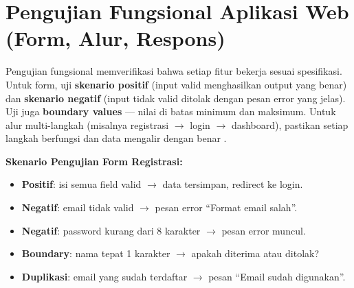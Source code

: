 \section{Pengujian Fungsional Aplikasi Web (Form, Alur, Respons)}

Pengujian fungsional memverifikasi bahwa setiap fitur bekerja sesuai spesifikasi. Untuk form, uji \textbf{skenario positif} (input valid menghasilkan output yang benar) dan \textbf{skenario negatif} (input tidak valid ditolak dengan pesan error yang jelas). Uji juga \textbf{boundary values} --- nilai di batas minimum dan maksimum. Untuk alur multi-langkah (misalnya registrasi $\to$ login $\to$ dashboard), pastikan setiap langkah berfungsi dan data mengalir dengan benar \cite{mdnToolsTesting}.

\begin{contoh}
\textbf{Skenario Pengujian Form Registrasi:}
\begin{itemize}
  \item \textbf{Positif}: isi semua field valid $\to$ data tersimpan, redirect ke login.
  \item \textbf{Negatif}: email tidak valid $\to$ pesan error ``Format email salah''.
  \item \textbf{Negatif}: password kurang dari 8 karakter $\to$ pesan error muncul.
  \item \textbf{Boundary}: nama tepat 1 karakter $\to$ apakah diterima atau ditolak?
  \item \textbf{Duplikasi}: email yang sudah terdaftar $\to$ pesan ``Email sudah digunakan''.
\end{itemize}
\end{contoh}


